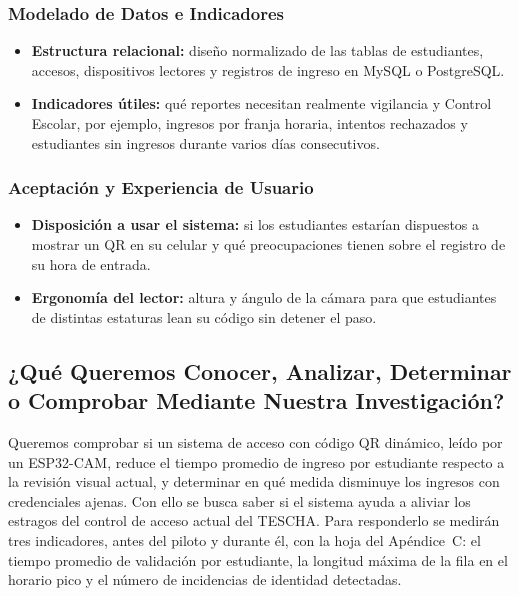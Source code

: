 \documentclass[stu,11pt,floatsintext,biblatex]{apa7}
\begin{document}
\subsubsection{Modelado de Datos e Indicadores}
\begin{itemize}
  \item \textbf{Estructura relacional:} diseño normalizado de las tablas de
  estudiantes, accesos, dispositivos lectores y registros de ingreso en MySQL
  o PostgreSQL.
  \item \textbf{Indicadores útiles:} qué reportes necesitan realmente
  vigilancia y Control Escolar, por ejemplo, ingresos por franja horaria,
  intentos rechazados y estudiantes sin ingresos durante varios días
  consecutivos.
\end{itemize}

\subsubsection{Aceptación y Experiencia de Usuario}
\begin{itemize}
  \item \textbf{Disposición a usar el sistema:} si los estudiantes estarían
  dispuestos a mostrar un QR en su celular y qué preocupaciones tienen sobre
  el registro de su hora de entrada.
  \item \textbf{Ergonomía del lector:} altura y ángulo de la cámara para que
  estudiantes de distintas estaturas lean su código sin detener el paso.
\end{itemize}

\subsection{¿Qué Queremos Conocer, Analizar, Determinar o Comprobar Mediante Nuestra Investigación?}
Queremos comprobar si un sistema de acceso con código QR dinámico, leído por
un ESP32-CAM, reduce el tiempo promedio de ingreso por estudiante respecto a
la revisión visual actual, y determinar en qué medida disminuye los ingresos
con credenciales ajenas. Con ello se busca saber si el sistema ayuda a aliviar
los estragos del control de acceso actual del TESCHA. Para responderlo se
medirán tres indicadores, antes del piloto y durante él, con la hoja del
Apéndice~C: el tiempo promedio de validación por estudiante, la longitud
máxima de la fila en el horario pico y el número de incidencias de identidad
detectadas.

\clearpage
\end{document}
